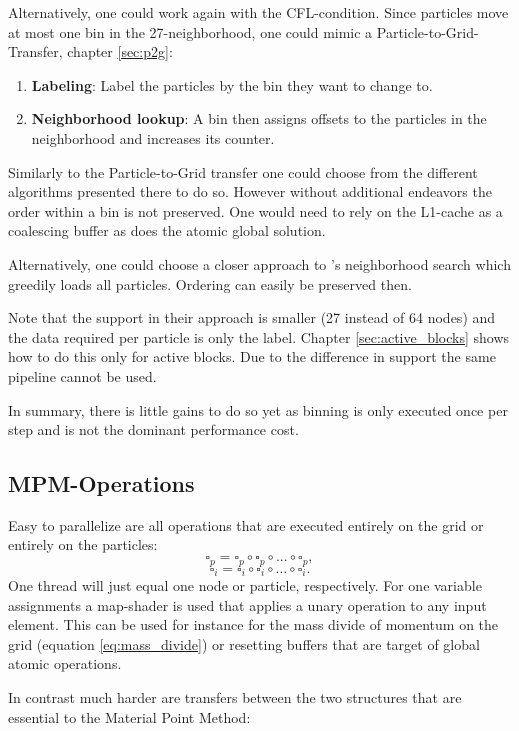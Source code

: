 \documentclass[m,times]{cgMA}
\begin{document}
Alternatively, one could work again with the CFL-condition. Since particles move at most one bin in the 27-neighborhood, one could mimic a Particle-to-Grid-Transfer, chapter \ref{sec:p2g}:
\begin{enumerate}
  \item \textbf{Labeling}: Label the particles by the bin they want to change to.
  \item \textbf{Neighborhood lookup}: A bin then assigns offsets to the particles in the neighborhood and increases its counter.
\end{enumerate}
Similarly to the Particle-to-Grid transfer one could choose from the different algorithms presented there to do so. However without additional endeavors the order within a bin is not preserved. One would need to rely on the L1-cache as a coalescing buffer as does the atomic global solution.

Alternatively, one could choose a closer approach to \cite{NVIDIA:NNSEARCH}'s neighborhood search which greedily loads all particles. Ordering can easily be preserved then.

Note that the support in their approach is smaller (27 instead of 64 nodes) and the data required per particle is only the label. Chapter \ref{sec:active_blocks} shows how to do this only for active blocks. Due to the difference in support the same pipeline cannot be used.

In summary, there is little gains to do so yet as binning is only executed once per step and is not the dominant performance cost.

\subsection{MPM-Operations}\label{sec:transfers}
Easy to parallelize are all operations that are executed entirely on the grid or entirely on the particles:
$$\square_p = \square_p \circ \square_p \circ ... \circ \square_p,$$
$$\square_i = \square_i \circ \square_i \circ ... \circ \square_i.$$
One thread will just equal one node or particle, respectively. For one variable assignments a map-shader is used that applies a unary operation to any input element. This can be used for instance for the mass divide of momentum on the grid (equation \ref{eq:mass_divide}) or resetting buffers that are target of global atomic operations.

In contrast much harder are transfers between the two structures that are essential to the Material Point Method:
\end{document}
